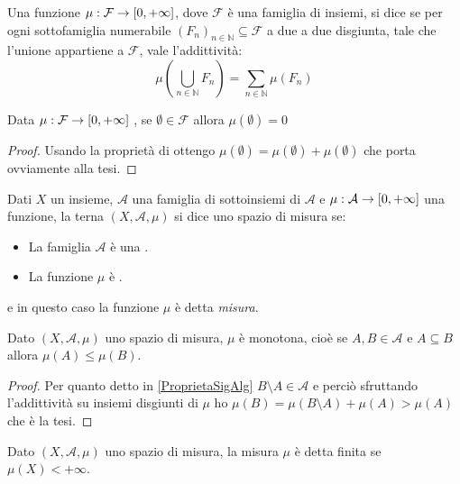 \begin{definition}[{\sigadd[ità]}]
	Una funzione $\mu:\mathcal F\to [0,+\infty]$, dove $\mathcal F$ è una famiglia di insiemi, si dice \sigadd{} se per ogni sottofamiglia numerabile $(F_n)_{n\in\mathbb N}\subseteq \mathcal F$ a due a due disgiunta, tale che l'unione appartiene a $\mathcal F$, vale l'addittività:
	\begin{equation*}
		\mu\left(\bigcup_{n\in\mathbb N}F_n \right)=\sum_{n\in\mathbb N} \mu(F_n) 
	\end{equation*}
\end{definition}
\begin{remark}
	Data $\mu:\mathcal F\to [0,+\infty]$ \sigadd{}, se $\emptyset\in \mathcal F$ allora $\mu(\emptyset)=0$
\end{remark}
\begin{proof}
	Usando la proprietà di \sigadd[ità] ottengo $\mu(\emptyset)=\mu(\emptyset)+\mu(\emptyset)$ che porta ovviamente alla tesi.
\end{proof}


\begin{definition}
	Dati $X$ un insieme, $\mathcal A$ una famiglia di sottoinsiemi di $\mathcal A$ e $\mu:\mathcal A\to [0,+\infty]$ una funzione, la terna $(X,\mathcal A, \mu)$ si dice uno spazio di misura se:
	\begin{itemize}
		\item La famiglia $\mathcal A$ è una \sigalg{}.
		\item La funzione $\mu$ è \sigadd{}.
	\end{itemize}
	e in questo caso la funzione $\mu$ è detta \emph{misura}.
\end{definition}

\begin{remark}\label{MonotoniaMisura}
	Dato $(X,\mathcal A,\mu)$ uno spazio di misura, $\mu$ è monotona, cioè se $A,B\in\mathcal A$ e $A\subseteq B$ allora $\mu(A)\le \mu(B)$.
\end{remark}
\begin{proof}
	Per quanto detto in \cref{ProprietaSigAlg} $B\setminus A\in\mathcal A$ e perciò sfruttando l'addittività su insiemi disgiunti di $\mu$ ho $\mu(B)=\mu(B\setminus A)+\mu(A)>\mu(A)$ che è la tesi.
\end{proof}

\begin{definition}\label{FinitezzaMisura}
	Dato $(X,\mathcal A,\mu)$ uno spazio di misura, la misura $\mu$ è detta finita se $\mu(X)<+\infty$.
\end{definition}


